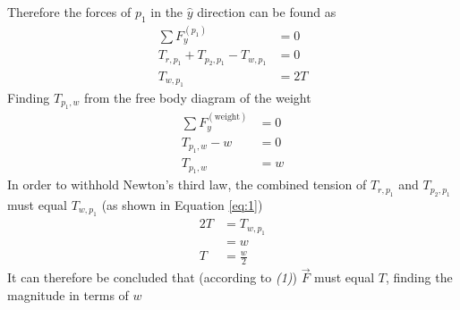 \documentclass{article}
\begin{document}
Therefore the forces of $ p_1 $ in the $ \hat{y} $ direction can be found as
\begin{align*}
	\sum F_y^{(p_1)} & = 0 \\
	T_{r,p_1} + T_{p_2,p_1} - T_{w,p_1} & = 0 \\
	T_{w,p_1} & = 2T
\end{align*}
Finding $ T_{p_1,w} $ from the free body diagram of the weight
\begin{align*}
	\sum F_y^{(\text{weight})} & = 0 \\
	T_{p_1,w} - w & = 0 \\
	T_{p_1,w} & = w
\end{align*}
In order to withhold Newton's third law, the combined tension of $ T_{r,p_1} $ and $ T_{p_2,p_1} $ must equal $ T_{w,p_1} $ (as shown in Equation \ref{eq:1})
\begin{align*}
	2T & = T_{w,p_1} \\
	   & = w \\
	T & = \frac{w}{2}
\end{align*}
It can therefore be concluded that (according to \textit{(1)}) $ \vec{F} $ must equal $ T $, finding the magnitude in terms of $ w $
\end{document}
